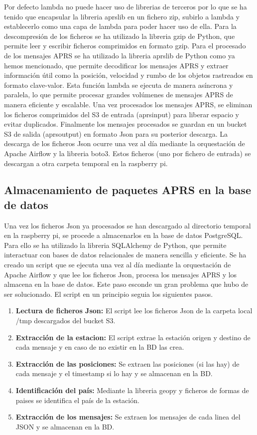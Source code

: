 Por defecto lambda no puede hacer uso de librerias de terceros por lo que se ha tenido que encapsular la libreria aprslib en un fichero zip, subirlo a lambda y establecerlo como una capa de lambda para poder hacer uso de ella.
Para la descompresión de los ficheros se ha utilizado la libreria gzip de Python, que permite leer y escribir ficheros comprimidos en formato gzip. 
Para el procesado de los mensajes APRS se ha utilizado la libreria aprslib de Python como ya hemos mencionado, que permite decodificar los mensajes APRS y extraer información útil como la posición, velocidad y rumbo de los objetos rastreados en formato clave-valor.
Esta función lambda se ejecuta de manera asíncrona y paralela, lo que permite procesar grandes volúmenes de mensajes APRS de manera eficiente y escalable. Una vez procesados los mensajes APRS, se eliminan los ficheros comprimidos del S3 de entrada (aprsinput) para liberar espacio y evitar duplicados.
Finalmente los mensajes procesados se guardan en un bucket S3 de salida (aprsoutput) en formato Json para su posterior descarga. La descarga de los ficheros Json ocurre una vez al día mediante la orquestación de Apache Airflow y la libreria boto3. Estos ficheros (uno por fichero de entrada) se descargan a otra carpeta temporal en la raspberry pi.


\subsection{Almacenamiento de paquetes APRS en la base de datos}
Una vez los ficheros Json ya procesados se han descargado al directorio temporal en la raspberry pi, se procede a almacenarlos en la base de datos PostgreSQL. Para ello se ha utilizado la libreria SQLAlchemy de Python, que permite interactuar con bases de datos relacionales de manera sencilla y eficiente. Se ha creado un script que se ejecuta una vez al día mediante la orquestación de Apache Airflow y que lee los ficheros Json, procesa los mensajes APRS y los almacena en la base de datos.
Este paso esconde un gran problema que hubo de ser solucionado. El script en un principio seguia los siguientes pasos.

\begin{enumerate}
	\item \textbf{Lectura de ficheros Json:} El script lee los ficheros Json de la carpeta local /tmp descargados del bucket S3.
	\item \textbf{Extracción de la estacion:} El script extrae la estación origen y destino de cada mensaje y en caso de no existir en la BD las crea.
	\item \textbf{Extracción de las posiciones:} Se extraen las posiciones (si las hay) de cada mensaje y el timestamp si lo hay y se almacenan en la BD.
	\item \textbf{Identificación del país:} Mediante la libreria geopy y ficheros de formas de paises se identifica el país de la estación.
	\item \textbf{Extracción de los mensajes:} Se extraen los mensajes de cada linea del JSON y se almacenan en la BD.
\end{enumerate}

